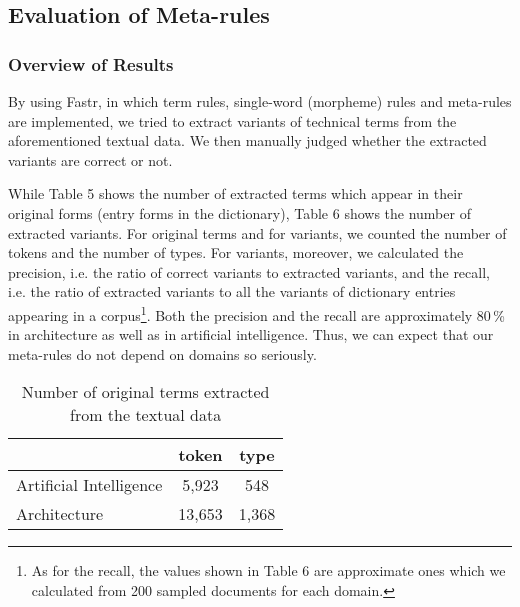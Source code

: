 \subsection{Evaluation of Meta-rules}

\subsubsection{Overview of Results}

By using Fastr, in which term rules, single-word (morpheme) rules and meta-rules are implemented, we tried to extract variants of technical terms from the aforementioned textual data. We then manually judged whether the extracted variants are correct or not.

While Table 5 shows the number of extracted terms which appear in their original forms (entry forms in the dictionary), Table 6 shows the number of extracted variants. For original terms and for variants, we counted the number of tokens and the number of types. For variants, moreover, we calculated the precision, i.e. the ratio of correct variants to extracted variants, and the recall, i.e. the ratio of extracted variants to all the variants of dictionary entries appearing in a corpus\footnote{As for the recall, the values shown in Table 6 are approximate ones which we calculated from 200 sampled documents for each domain.}. Both the precision and the recall are approximately 80\,\% in architecture as well as in artificial intelligence. Thus, we can expect that our meta-rules do not depend on domains so seriously.

\begin{table*}[htb]
\begin{center}
\begin{tabular}{l|c|c}
\hline
& token & type\\
\hline
\hline
Artificial Intelligence & 5,923 & 548\\
Architecture & 13,653 & 1,368\\
\hline
\end{tabular}

\end{center}
\caption{Number of original terms extracted from the textual data}
\end{table*}

